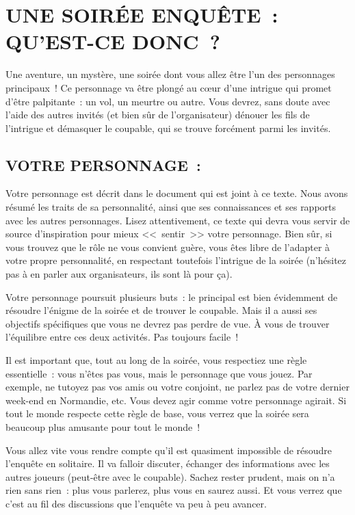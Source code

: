 \documentclass[14pt,twocolumn]{extarticle}
\begin{document}
\section{UNE SOIRÉE ENQUÊTE~: QU'EST-CE DONC~?}

Une aventure, un mystère, une soirée dont vous allez être l’un des personnages
principaux~! Ce personnage va être plongé au c\oe{}ur d’une intrigue qui promet
d’être palpitante~: un vol, un meurtre ou autre. Vous devrez, sans doute avec
l’aide des autres invités (et bien sûr de l’organisateur) dénouer les fils de
l’intrigue et démasquer le coupable, qui se trouve forcément parmi les invités.

\subsection{VOTRE PERSONNAGE~:}

Votre personnage est décrit dans le document qui est joint à ce texte. Nous
avons résumé les traits de sa personnalité, ainsi que ses connaissances et ses
rapports avec les autres personnages. Lisez attentivement, ce texte qui devra
vous servir de source d’inspiration pour mieux <<~sentir~>> votre personnage.
Bien sûr, si vous trouvez que le rôle ne vous convient guère, vous êtes libre
de l’adapter à votre propre personnalité, en respectant toutefois l’intrigue
de la soirée (n’hésitez pas à en parler aux organisateurs, ils sont là pour
ça).

Votre personnage poursuit plusieurs buts~: le principal est bien évidemment de
résoudre l’énigme de la soirée et de trouver le coupable. Mais il a aussi ses
objectifs spécifiques que vous ne devrez pas perdre de vue. À vous de trouver
l’équilibre entre ces deux activités. Pas toujours facile~!

Il est important que, tout au long de la soirée, vous respectiez une règle
essentielle~: vous n’êtes pas vous, mais le personnage que vous jouez. Par
exemple, ne tutoyez pas vos amis ou votre conjoint, ne parlez pas de votre
dernier week-end en Normandie, etc. Vous devez agir comme votre personnage
agirait. Si tout le monde respecte cette règle de base, vous verrez que la
soirée sera beaucoup plus amusante pour tout le monde~!

Vous allez vite vous rendre compte qu’il est quasiment impossible de résoudre
l’enquête en solitaire. Il va falloir discuter, échanger des informations avec
les autres joueurs (peut-être avec le coupable). Sachez rester prudent, mais on
n’a rien sans rien~: plus vous parlerez, plus vous en saurez aussi. Et vous
verrez que c’est au fil des discussions que l’enquête va peu à peu avancer.
\end{document}
